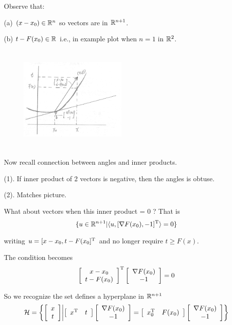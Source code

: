 Observe that:

(a) $(x-x_{0})\in \mathbb{R}^{n}$ so vectors are in $\mathbb{R}^{n+1}$.

(b) $t-F(x_{0})\in\mathbb{R}$ i.e., in example plot when $n=1$ in $\mathbb{R}^{2}$.

\begin{figure}
	\centering
	\includegraphics[width=2.1in,height=2.1in]{figures/ch02/p64.jpg}
\end{figure}

\vspace{0.5cm}
Now recall connection between angles and inner products.

(1). If inner product of 2 vectors is negative, then the angles is obtuse.

(2). Matches picture.

What about vectors when this inner product = 0 ? That is
$$\{u\in\mathbb{R}^{n+1}|\langle u, [\nabla F(x_{0}) , -1]^{{\rm T}}\rangle=0\}$$

writing $u=[x-x_{0}, t-F(x_{0}]^{{\rm T}}$ and no longer require $t\geq F(x)$.

The condition becomes
$$
\left[
\begin{array}{c} 
	x-x_{0}\\
	t-F(x_{0})
\end{array}
\right]^{{\rm T}}  
\left[
\begin{array}{c} 
\nabla F(x_{0})\\
-1
\end{array}
\right]
=
0
$$

So we recognize the set defines a hyperplane in $\mathbb{R}^{n+1}$
$$\mathcal{H}=\left\{\left[
\begin{array}{c} 
	x \\
    t
\end{array}
\right]  
\middle|      
\left[
\begin{array}{cc} 
x^{{\rm T}}&t
\end{array}
\right]  
\left[
\begin{array}{c} 
\nabla F(x_{0}) \\
-1
\end{array}
\right]  
=
\left[
\begin{array}{cc} 
x_{0}^{{\rm T}}&F(x_{0})
\end{array}
\right]  
\left[
\begin{array}{c} 
	\nabla F(x_{0}) \\
	-1
\end{array}
\right]  
\right\}$$

